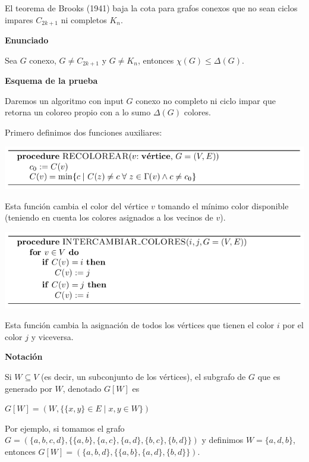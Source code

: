 \documentclass[10pt,a4paper]{article}
\begin{document}
El teorema de Brooks (1941) baja la cota para grafos conexos que no sean ciclos impares $C_{2k+1}$ ni completos $K_n$.

\textbf{Enunciado}

Sea $G$ conexo, $G\neq C_{2k+1}$ y $G\neq K_n$, entonces $\chi(G) \leq \Delta(G)$.

\textbf{Esquema de la prueba}

Daremos un algoritmo con input $G$ conexo no completo ni ciclo impar que retorna un coloreo propio con a lo sumo $\Delta(G)$ colores.

Primero definimos dos funciones auxiliares:


    \begin{adjustbox}{max size={\textwidth}{\textheight}}
        \includegraphics{definitions/algo_recolorear.png}
        \end{adjustbox}
    

Esta función cambia el color del vértice $v$ tomando el mínimo color disponible (teniendo en cuenta los colores asignados a los vecinos de $v$).


    \begin{adjustbox}{max size={\textwidth}{\textheight}}
        \includegraphics{definitions/alg_interc.png}
        \end{adjustbox}
    

Esta función cambia la asignación de todos los vértices que tienen el color $i$ por el color $j$ y viceversa.

\textbf{Notación}

Si $W \subseteq V$ (es decir, un subconjunto de los vértices), el subgrafo de $G$ que es generado por $W$, denotado $G[W]$ es

\begin{center}
$G[W] = (W, \{\{x, y\} \in E \mid x, y \in W\})$
\end{center}

Por ejemplo, si tomamos el grafo $G = (\{a, b, c, d\}, \{\{a, b\},\{a, c\},\{a, d\},\{b,c\}, \{b, d\}\})$ y definimos $W = \{a, d, b\}$, entonces $G[W] = (\{a, b, d\}, \{\{a, b\},\{a, d\}, \{b, d\}\})$.
\end{document}
